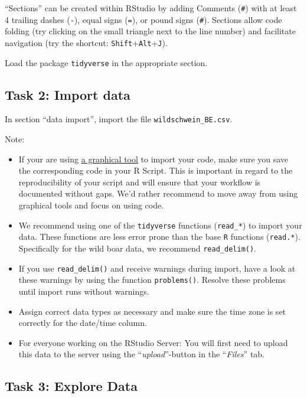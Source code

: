 \documentclass[]{book}
\providecommand{\tightlist}{%
  \setlength{\itemsep}{0pt}\setlength{\parskip}{0pt}}
\theoremstyle{definition}
\theoremstyle{definition}
\theoremstyle{definition}
\theoremstyle{remark}
\begin{document}
``Sections'' can be created within RStudio by adding Comments
(\texttt{\#}) with at least 4 trailing dashes (\texttt{-}), equal signs
(\texttt{=}), or pound signs (\texttt{\#}). Sections allow code folding
(try clicking on the small triangle next to the line number) and
facilitate navigation (try the shortcut:
\texttt{Shift}+\texttt{Alt}+\texttt{J}).

Load the package \texttt{tidyverse} in the appropriate section.

\subsection{Task 2: Import data}\label{task-2-import-data}

In section ``data import'', import the file
\texttt{wildschwein\_BE.csv}.

Note:

\begin{itemize}
\tightlist
\item
  If your are using
  \href{https://support.rstudio.com/hc/en-us/articles/218611977-Importing-Data-with-RStudio}{a
  graphical tool} to import your code, make sure you save the
  corresponding code in your R Script. This is important in regard to
  the reproducibility of your script and will ensure that your workflow
  is documented without gaps. We'd rather recommend to move away from
  using graphical tools and focus on using code.
\item
  We recommend using one of the \texttt{tidyverse} functions
  (\texttt{read\_*}) to import your data. These functions are less error
  prone than the base \texttt{R} functions (\texttt{read.*}).
  Specifically for the wild boar data, we recommend
  \texttt{read\_delim()}.
\item
  If you use \texttt{read\_delim()} and receive warnings during import,
  have a look at these warnings by using the function
  \texttt{problems()}. Resolve these problems until import runs without
  warnings.
\item
  Assign correct data types as necessary and make sure the time zone is
  set correctly for the date/time column.
\item
  For everyone working on the RStudio Server: You will first need to
  upload this data to the server using the ``\emph{upload}''-button in
  the ``\emph{Files}'' tab.
\end{itemize}

\subsection{Task 3: Explore Data}\label{task-3-explore-data}
\end{document}
